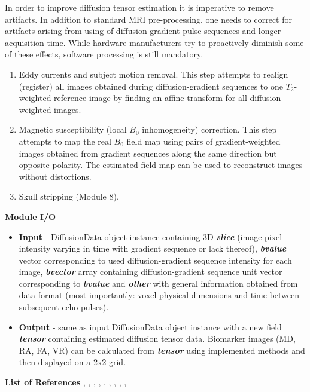 In order to improve diffusion tensor estimation it is imperative to remove artifacts. In addition to standard MRI pre-processing, one needs to correct for artifacts arising from using of diffusion-gradient pulse sequences and longer acquisition time. While hardware manufacturers try to proactively diminish some of these effects, software processing is still mandatory.
\begin{enumerate}
	\item Eddy currents and subject motion removal.\newline
	This step attempts to realign (register) all images obtained during diffusion-gradient sequences to one $T_2$-weighted reference image by finding an affine transform for all diffusion-weighted images.
	\item Magnetic susceptibility (local $B_0$ inhomogeneity) correction.\newline
	This step attempts to map the real $B_0$ field map using pairs of gradient-weighted images obtained from gradient sequences along the same direction but opposite polarity. The estimated field map can be used to reconstruct images without distortions.
	\item Skull stripping (Module 8).
\end{enumerate}

\hfill\newline
\textbf{Module I/O}
\begin{itemize}
	\item \textbf{Input} - DiffusionData object instance containing 3D \textbf{\emph{slice}} (image pixel intensity varying in time with gradient sequence or lack thereof), \textbf{\emph{bvalue}} vector corresponding to used diffusion-gradient sequence intensity for each image, \textbf{\emph{bvector}} array containing diffusion-gradient sequence unit vector corresponding to \textbf{\emph{bvalue}} and \textbf{\emph{other}} with general information obtained from data format (most importantly: voxel physical dimensions and time between subsequent echo pulses).
	\item \textbf{Output} - same as input DiffusionData object instance with a new field \textbf{\emph{tensor}} containing estimated diffusion tensor data. Biomarker images (MD, RA, FA, VR) can be calculated from \textbf{\emph{tensor}} using implemented methods and then displayed on a 2x2 grid.
\end{itemize}

\hfill\newline
\textbf{List of References}\newline
\cite{6_dti_1}, \cite{6_dti_2}, \cite{6_dti_3}, \cite{6_dti_4}, \cite{6_dti_5}, \cite{6_dti_6}, \cite{6_dti_7}, \cite{6_dti_8}, \cite{6_dti_9}, \cite{6_dti_10}